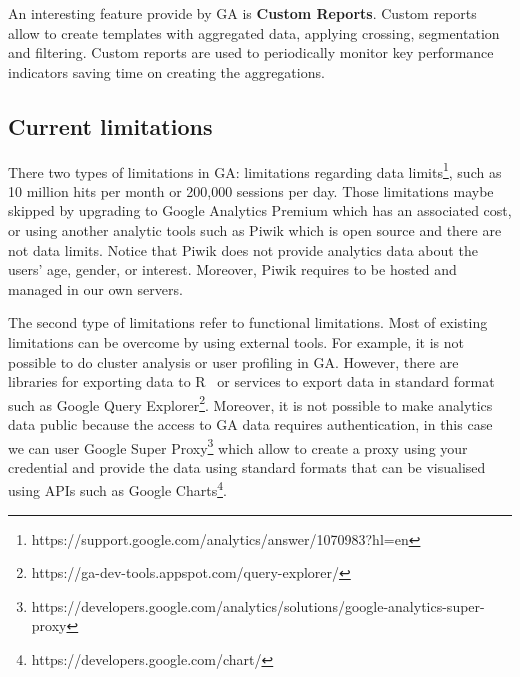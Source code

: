 \documentclass{article}
\begin{document}
An interesting feature provide by GA is \textbf{Custom Reports}. Custom reports allow to create templates with aggregated data, applying crossing, segmentation and filtering. Custom reports are used to periodically monitor key performance indicators saving time on creating the aggregations. 


\subsection{Current limitations}

There two types of limitations in GA: limitations regarding data limits\footnote{https://support.google.com/analytics/answer/1070983?hl=en}, such as 10 million hits per month or 200,000 sessions per day. Those limitations maybe skipped by upgrading to Google Analytics Premium which has an associated cost, or using another analytic tools such as Piwik which is open source and there are not data limits. Notice that Piwik does not provide analytics data about the users' age, gender, or interest. Moreover, Piwik requires to be hosted and managed in our own servers. 

The second type of limitations refer to functional limitations. Most of existing limitations can be overcome by using external tools. For example, it is not possible to do cluster analysis or user profiling in GA. However, there are libraries for exporting data to R~\cite{} or services to export data in standard format such as Google Query Explorer\footnote{https://ga-dev-tools.appspot.com/query-explorer/}. Moreover, it is not possible to make analytics data public because the access to GA data requires authentication, in this case we can user Google Super Proxy\footnote{https://developers.google.com/analytics/solutions/google-analytics-super-proxy} which allow to create a proxy using your credential and provide the data using standard formats that can be visualised using APIs such as Google Charts\footnote{https://developers.google.com/chart/}.
\end{document}
